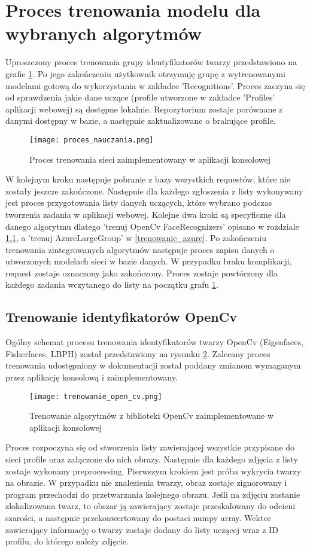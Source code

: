 \section{Proces trenowania modelu dla wybranych algorytmów}
Uproszczony proces trenowania grupy identyfikatorów twarzy przedstawiono na grafie \ref{fig:trenowanie_proces}. Po jego zakończeniu użytkownik otrzymuję grupę z wytrenowanymi modelami gotową do wykorzystania w zakładce 'Recognitions'.
Proces zaczyna się od sprawdzenia jakie dane uczące (profile utworzone w zakładce 'Profiles' aplikacji webowej) są dostępne lokalnie. Repozytorium zostaje porównane z danymi dostępny w bazie, a następnie zaktualizowane o brakujące profile.
\begin{figure}[H]
	\centering
	\texttt{[image: proces\_nauczania.png]}
	\caption{Proces trenowania sieci zaimplementowany w aplikacji konsolowej}
	\label{fig:trenowanie_proces}
\end{figure}
W kolejnym kroku następuje pobranie z bazy wszystkich requestów, które nie zostały jeszcze zakończone. Następnie dla każdego zgłoszenia z listy wykonywany jest proces przygotowania listy danych uczących, które wybrano podczas tworzenia zadania w aplikacji webowej. Kolejne dwa kroki są specyficzne dla danego algorytmu dlatego 'trenuj OpenCv FaceRecognizers' opisano w rozdziale \ref{trenowanie_open_cv}, a 'trenuj AzureLargeGroup' w \ref{trenowanie_azure}. Po zakończeniu trenowania zintegrowanych algorytmów następuje proces zapisu danych o utworzonych modelach sieci w bazie danych.
W przypadku braku komplikacji, request zostaje oznaczony jako zakończony. Proces zostaje powtórzony dla każdego zadania wczytanego do listy na początku grafu \ref{fig:trenowanie_proces}.

\subsection{Trenowanie identyfikatorów OpenCv} \label{trenowanie_open_cv}
Ogólny schemat procesu trenowania identyfikatorów twarzy OpenCv (Eigenfaces, Fisherfaces, LBPH) został przedstawiony na rysunku \ref{fig:trenowanie_open_cv}. Zalecany proces trenowania udostępniony w dokumentacji \cite{opencv_doc} został poddany zmianom wymaganym przez aplikację konsolową i zaimplementowany.
\begin{figure}[H]
	\centering
	\texttt{[image: trenowanie\_open\_cv.png]}
	\caption{Trenowanie algorytmów z biblioteki OpenCv zaimplementowane w aplikacji konsolowej}
	\label{fig:trenowanie_open_cv}
\end{figure}
Proces rozpoczyna się od stworzenia listy zawierającej wszystkie przypisane do sieci profile oraz załączone do nich obrazy. Następnie dla każdego zdjęcia z listy zostaje wykonany preprocessing. Pierwszym krokiem jest próba wykrycia twarzy na obrazie. W przypadku nie znalezienia twarzy, obraz zostaje zignorowany i program przechodzi do przetwarzania kolejnego obrazu. Jeśli na zdjęciu zostanie zlokalizowana twarz, to obszar ją zawierający zostaje przeskalowany do odcieni szarości, a następnie przekonwertowany do postaci numpy array. Wektor zawierający informację o twarzy zostaje dodany do listy uczącej wraz z ID profilu, do którego należy zdjęcie. 

